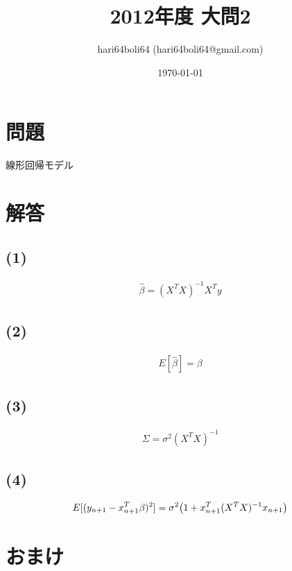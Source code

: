 \documentclass[a4paper, 10pt, dvipdfmx]{jlreq}
\begin{document}
\title{2012年度 大問2}
\author{hari64boli64 (hari64boli64@gmail.com)}
\date{\today}
\maketitle

\section{問題}

線形回帰モデル

\section{解答}

\subsection*{(1)}

\begin{align*}
  \hat{\beta}=(X^TX)^{-1}X^Ty
\end{align*}

\subsection*{(2)}

\begin{align*}
  E[\hat{\beta}] =\beta
\end{align*}

\subsection*{(3)}

\begin{align*}
  \Sigma=\sigma^2(X^TX)^{-1}
\end{align*}

\subsection*{(4)}

\begin{align*}
  E[(y_{n+1}-x_{n+1}^T\beta)^2]=\sigma^2\qty(1+x_{n+1}^T(X^TX)^{-1}x_{n+1})
\end{align*}

\section{おまけ}
\end{document}
